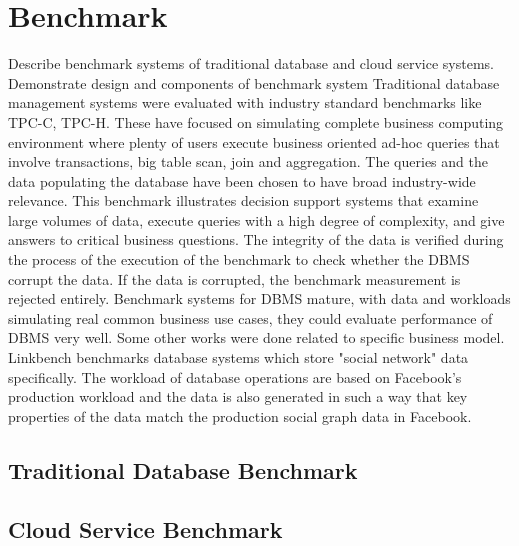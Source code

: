 \section{Benchmark}
Describe benchmark systems of traditional database and cloud service systems. 
Demonstrate design and components of benchmark system
Traditional database management systems were evaluated with industry standard benchmarks like TPC-C\cite{TPC-C}, TPC-H\cite{TPC-H}. These have focused on simulating complete business computing environment where plenty of users execute business oriented ad-hoc queries that involve transactions, big table scan, join and aggregation. The queries and the data populating the database have been chosen to have broad industry-wide relevance. This benchmark illustrates decision support systems that examine large volumes of data, execute queries with a high degree of complexity, and give answers to critical business questions\cite{TPC-H}. The integrity of the data is verified during the process of the execution of the benchmark to check whether the DBMS corrupt the data. If the data is corrupted, the benchmark measurement is rejected entirely\cite{dey2014ycsb+t}. Benchmark systems for DBMS mature, with data and workloads simulating real common business use cases, they could evaluate performance of DBMS very well. Some other works were done related to specific business model. Linkbench\cite{LinkBench} benchmarks database systems which store "social network" data specifically. The workload of database operations are based on Facebook's production workload and the data is also generated in such a way that key properties of the data match the production social graph data in Facebook.  

\subsection{Traditional Database Benchmark}
\subsection{Cloud Service Benchmark}


\clearpage
